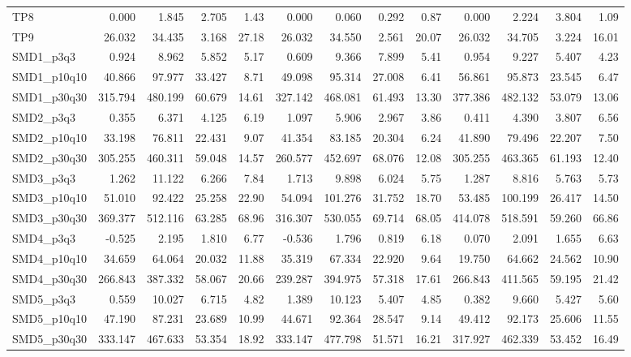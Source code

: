 \begin{longtable}{lrrrrrrrrrrrr}
TP8 & 0.000 & 1.845 & 2.705 & 1.43 & 0.000 & 0.060 & 0.292 & 0.87 & 0.000 & 2.224 & 3.804 & 1.09 \\
TP9 & 26.032 & 34.435 & 3.168 & 27.18 & 26.032 & 34.550 & 2.561 & 20.07 & 26.032 & 34.705 & 3.224 & 16.01 \\
SMD1\_p3q3 & 0.924 & 8.962 & 5.852 & 5.17 & 0.609 & 9.366 & 7.899 & 5.41 & 0.954 & 9.227 & 5.407 & 4.23 \\
SMD1\_p10q10 & 40.866 & 97.977 & 33.427 & 8.71 & 49.098 & 95.314 & 27.008 & 6.41 & 56.861 & 95.873 & 23.545 & 6.47 \\
SMD1\_p30q30 & 315.794 & 480.199 & 60.679 & 14.61 & 327.142 & 468.081 & 61.493 & 13.30 & 377.386 & 482.132 & 53.079 & 13.06 \\
SMD2\_p3q3 & 0.355 & 6.371 & 4.125 & 6.19 & 1.097 & 5.906 & 2.967 & 3.86 & 0.411 & 4.390 & 3.807 & 6.56 \\
SMD2\_p10q10 & 33.198 & 76.811 & 22.431 & 9.07 & 41.354 & 83.185 & 20.304 & 6.24 & 41.890 & 79.496 & 22.207 & 7.50 \\
SMD2\_p30q30 & 305.255 & 460.311 & 59.048 & 14.57 & 260.577 & 452.697 & 68.076 & 12.08 & 305.255 & 463.365 & 61.193 & 12.40 \\
SMD3\_p3q3 & 1.262 & 11.122 & 6.266 & 7.84 & 1.713 & 9.898 & 6.024 & 5.75 & 1.287 & 8.816 & 5.763 & 5.73 \\
SMD3\_p10q10 & 51.010 & 92.422 & 25.258 & 22.90 & 54.094 & 101.276 & 31.752 & 18.70 & 53.485 & 100.199 & 26.417 & 14.50 \\
SMD3\_p30q30 & 369.377 & 512.116 & 63.285 & 68.96 & 316.307 & 530.055 & 69.714 & 68.05 & 414.078 & 518.591 & 59.260 & 66.86 \\
SMD4\_p3q3 & -0.525 & 2.195 & 1.810 & 6.77 & -0.536 & 1.796 & 0.819 & 6.18 & 0.070 & 2.091 & 1.655 & 6.63 \\
SMD4\_p10q10 & 34.659 & 64.064 & 20.032 & 11.88 & 35.319 & 67.334 & 22.920 & 9.64 & 19.750 & 64.662 & 24.562 & 10.90 \\
SMD4\_p30q30 & 266.843 & 387.332 & 58.067 & 20.66 & 239.287 & 394.975 & 57.318 & 17.61 & 266.843 & 411.565 & 59.195 & 21.42 \\
SMD5\_p3q3 & 0.559 & 10.027 & 6.715 & 4.82 & 1.389 & 10.123 & 5.407 & 4.85 & 0.382 & 9.660 & 5.427 & 5.60 \\
SMD5\_p10q10 & 47.190 & 87.231 & 23.689 & 10.99 & 44.671 & 92.364 & 28.547 & 9.14 & 49.412 & 92.173 & 25.606 & 11.55 \\
SMD5\_p30q30 & 333.147 & 467.633 & 53.354 & 18.92 & 333.147 & 477.798 & 51.571 & 16.21 & 317.927 & 462.339 & 53.452 & 16.49 \\

\end{longtable}
